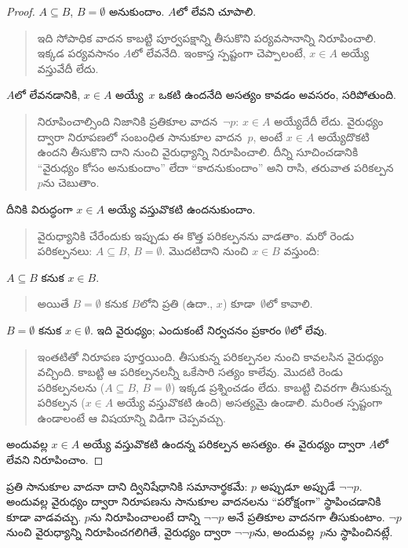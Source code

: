 \documentclass[../../../include/open-logic-section]{subfiles}
\begin{document}
\begin{proof}
  $A \subseteq B$, $B = \emptyset$ అనుకుందాం. $A$లో  లేవని చూపాలి.
  \begin{quote}
    ఇది సోపాధిక వాదన కాబట్టి పూర్వపక్షాన్ని తీసుకొని పర్యవసానాన్ని నిరూపించాలి. ఇక్కడ పర్యవసానం $A$లో  లేవనేది. ఇంకాస్త
    స్పష్టంగా చెప్పాలంటే, $x \in A$ అయ్యే వస్తువేదీ లేదు.
  \end{quote}
  $A$లో  లేవనడానికి,
  $x \in A$ అయ్యే~$x$ ఒకటి ఉందనేది అసత్యం కావడం అవసరం, సరిపోతుంది.
  \begin{quote}
    నిరూపించాల్సింది నిజానికి ప్రతికూల వాదన~$\lnot p$: $x \in A$ అయ్యేదేదీ లేదు. వైరుధ్యం ద్వారా నిరూపణలో సంబంధిత సానుకూల వాదన~$p$, అంటే $x \in A$ అయ్యేదొకటి ఉందని తీసుకొని దాని నుంచి వైరుధ్యాన్ని నిరూపించాలి. దీన్ని సూచించడానికి ``వైరుధ్యం కోసం అనుకుందాం'' లేదా ``కాదనుకుందాం'' అని రాసి, తరువాత పరికల్పన~$p$ను చెబుతాం.
  \end{quote}
  దీనికి విరుద్ధంగా $x \in A$ అయ్యే వస్తువొకటి ఉందనుకుందాం.
  \begin{quote}
    వైరుధ్యానికి చేరేందుకు ఇప్పుడు ఈ కొత్త పరికల్పనను వాడతాం. మరో రెండు పరికల్పనలు: $A \subseteq B$, $B = \emptyset$. మొదటిదాని నుంచి $x \in B$ వస్తుంది:
  \end{quote}
  $A \subseteq B$ కనుక $x \in B$.
  \begin{quote}
    అయితే $B = \emptyset$ కనుక $B$లోని ప్రతి  (ఉదా., $x$) కూడా~$\emptyset$లో  కావాలి.
  \end{quote}
  $B = \emptyset$ కనుక $x \in \emptyset$. ఇది వైరుధ్యం; ఎందుకంటే నిర్వచనం ప్రకారం $\emptyset$లో  లేవు.
  \begin{quote}
    ఇంతటితో నిరూపణ పూర్తయింది. తీసుకున్న పరికల్పనల నుంచి
    కావలసిన వైరుధ్యం వచ్చింది. కాబట్టి ఆ పరికల్పనలన్నీ ఒకేసారి
    సత్యం కాలేవు. మొదటి రెండు పరికల్పనలను ($A \subseteq B$,
    $B = \emptyset$) ఇక్కడ ప్రశ్నించడం లేదు. కాబట్టి చివరగా
    తీసుకున్న పరికల్పన ($x \in A$ అయ్యే వస్తువొకటి ఉంది)
    అసత్యమై ఉండాలి. మరింత స్పష్టంగా ఉండాలంటే ఆ విషయాన్ని
    విడిగా చెప్పవచ్చు.
  \end{quote}
  అందువల్ల $x \in A$ అయ్యే వస్తువొకటి ఉందన్న పరికల్పన అసత్యం.
  ఈ వైరుధ్యం ద్వారా $A$లో  లేవని నిరూపించాం.
\end{proof}

ప్రతి సానుకూల వాదనా దాని ద్వినిషేధానికి సమానార్థకమే: $p$ అప్పుడూ అప్పుడే $\lnot\lnot p$. అందువల్ల వైరుధ్యం ద్వారా నిరూపణను సానుకూల వాదనలను ``పరోక్షంగా'' స్థాపించడానికి కూడా వాడవచ్చు. $p$ను నిరూపించాలంటే దాన్ని $\lnot\lnot p$ అనే ప్రతికూల వాదనగా తీసుకుంటాం. $\lnot p$ నుంచి వైరుధ్యాన్ని నిరూపించగలిగితే, వైరుధ్యం ద్వారా $\lnot\lnot p$ను, అందువల్ల~$p$ను స్థాపించినట్లే.
\end{document}
